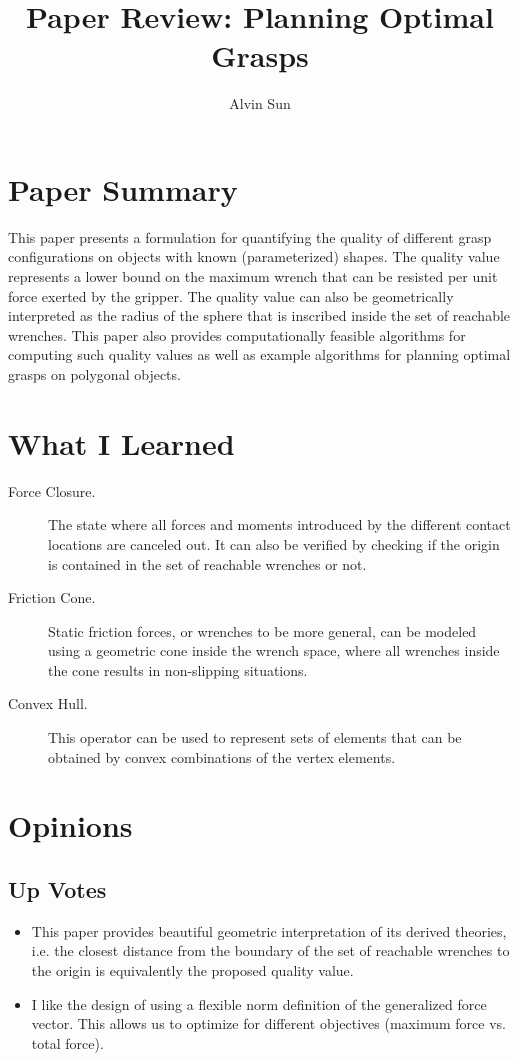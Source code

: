 \documentclass[10pt, twocolumn]{article}
\title{Paper Review: Planning Optimal Grasps}
\author{Alvin Sun}
\begin{document}
\maketitle

\section{Paper Summary}
This paper presents a formulation for quantifying the quality of different 
grasp configurations on objects with known (parameterized) shapes. The quality 
value represents a lower bound on the maximum wrench that can be resisted 
per unit force exerted by the gripper. The quality value can also be 
geometrically interpreted as the radius of the sphere that is inscribed inside
the set of reachable wrenches. This paper also provides
computationally feasible algorithms for computing such quality values as well
as example algorithms for planning optimal grasps on polygonal objects.

\section{What I Learned}

\begin{description}
    \item[Force Closure.] The state where all forces and moments introduced 
        by the different contact locations are canceled out. It can also be 
        verified by checking if the origin is contained in the set of
        reachable wrenches or not.

    \item[Friction Cone.] Static friction forces, or wrenches to be more 
        general, can be modeled using a geometric cone inside the wrench space, 
        where all wrenches inside the cone results in non-slipping situations.

    \item[Convex Hull.] This operator can be used
        to represent sets of elements that can be obtained by convex combinations
        of the vertex elements.
\end{description}

\section{Opinions}

\subsection{Up Votes}
\begin{itemize}
    \item This paper provides beautiful geometric interpretation of its
        derived theories, i.e. the closest distance from the boundary
        of the set of reachable wrenches to the origin is equivalently 
        the proposed quality value.
    \item I like the design of using a flexible norm definition of the
        generalized force vector. This allows us to optimize for different 
        objectives (maximum force vs. total force).
\end{itemize}
\end{document}
